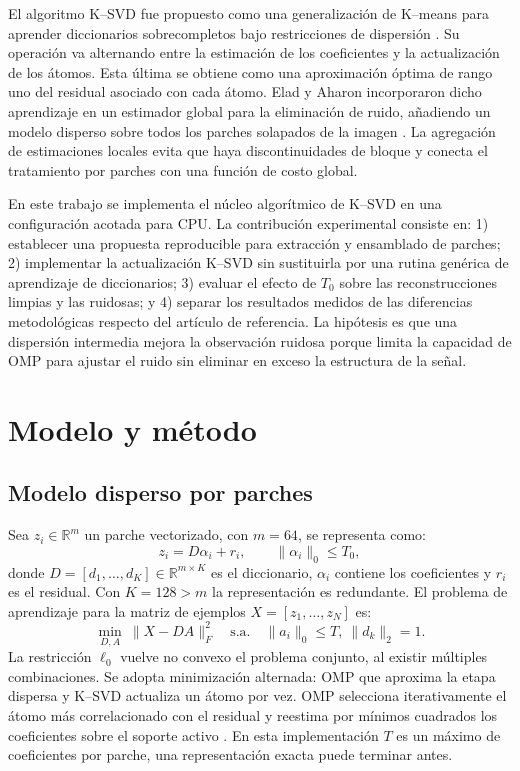 \documentclass[conference]{IEEEtran}
\begin{document}
El algoritmo K--SVD fue propuesto como una generalización de K--means para aprender diccionarios sobrecompletos bajo restricciones de dispersión \cite{aharon}. Su operación va alternando entre la estimación de los coeficientes y la actualización de los átomos. Esta última se obtiene como una aproximación óptima de rango uno del residual asociado con cada átomo. Elad y Aharon incorporaron dicho aprendizaje en un estimador global para la eliminación de ruido, añadiendo un modelo disperso sobre todos los parches solapados de la imagen \cite{elad}. La agregación de estimaciones locales evita que haya discontinuidades de bloque y conecta el tratamiento por parches con una función de costo global.

En este trabajo se implementa el núcleo algorítmico de K--SVD en una configuración acotada para CPU. La contribución experimental consiste en: 1) establecer una propuesta reproducible para extracción y ensamblado de parches; 2) implementar la actualización K--SVD sin sustituirla por una rutina genérica de aprendizaje de diccionarios; 3) evaluar el efecto de $T_0$ sobre las reconstrucciones limpias y las ruidosas; y 4) separar los resultados medidos de las diferencias metodológicas respecto del artículo de referencia. La hipótesis es que una dispersión intermedia mejora la observación ruidosa porque limita la capacidad de OMP para ajustar el ruido sin eliminar en exceso la estructura de la señal.

\section{Modelo y método}
\subsection{Modelo disperso por parches}
Sea $z_i\in\mathbb{R}^{m}$ un parche vectorizado, con $m=64$, se representa como:
\begin{equation}
 z_i=D\alpha_i+r_i,\qquad \|\alpha_i\|_0\leq T_0,
 \label{eq:model}
\end{equation}
donde $D=[d_1,\ldots,d_K]\in\mathbb{R}^{m\times K}$ es el diccionario, $\alpha_i$ contiene los coeficientes y $r_i$ es el residual. Con $K=128>m$ la representación es redundante. El problema de aprendizaje para la matriz de ejemplos $X=[z_1,\ldots,z_N]$ es:
\begin{equation}
 \min_{D,A}\ \|X-DA\|_F^2 \quad
 \text{s.a.}\quad \|a_i\|_0\leq T,\ \|d_k\|_2=1.
 \label{eq:ksvdobjective}
\end{equation}
La restricción $\ell_0$ vuelve no convexo el problema conjunto, al existir múltiples combinaciones. Se adopta minimización alternada: OMP que aproxima la etapa dispersa y K--SVD actualiza un átomo por vez. OMP selecciona iterativamente el átomo más correlacionado con el residual y reestima por mínimos cuadrados los coeficientes sobre el soporte activo \cite{pati,mallat}. En esta implementación $T$ es un máximo de coeficientes por parche, una representación exacta puede terminar antes.
\end{document}
